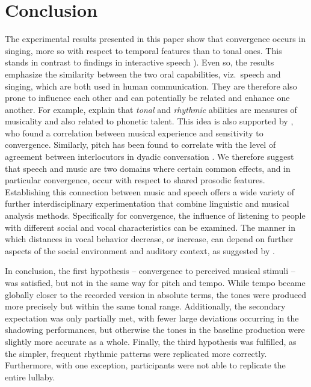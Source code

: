 \section{Conclusion}
\label{sec:conclusion_shadowing}


The experimental results presented in this paper show that convergence occurs in singing, more so with respect to temporal features than to tonal ones.
This stands in contrast to findings in interactive speech \citep[e.g.,][]{Raveh2019InterspeechAlexa}).
Even so, the results emphasize the similarity between the two oral capabilities, viz.\ speech and singing, which are both used in human communication.
They are therefore also prone to influence each other and can potentially be related and enhance one another.
For example, \citet[][p.\ 216]{Nardo2009musicality} explain that \emph{tonal} and \emph{rhythmic} abilities are measures of musicality and also related to phonetic talent.
This idea is also supported by \citet{Tsang2018musical}, who found a correlation between musical experience and sensitivity to convergence.
Similarly, pitch has been found to correlate with the level of agreement between interlocutors in dyadic conversation \citep{Okada2012interpreting}.
We therefore suggest that speech and music are two domains where certain common effects, and in particular convergence, occur with respect to shared prosodic features.
Establishing this connection between music and speech offers a wide variety of further interdisciplinary experimentation that combine linguistic and musical analysis methods.
Specifically for convergence, the influence of listening to people with different social and vocal characteristics can be examined.
The manner in which distances in vocal behavior decrease, or increase, can depend on further aspects of the social environment and auditory context, as suggested by \citet{Noy1999psychoanalysis}.

In conclusion, the first hypothesis -- convergence to perceived musical stimuli -- was satisfied, but not in the same way for pitch and tempo.
While tempo became globally closer to the recorded version in absolute terms, the tones were produced more precisely but within the same tonal range.
Additionally, the secondary expectation was only partially met, with fewer large deviations occurring in the shadowing performances, but otherwise the tones in the baseline production were slightly more accurate as a whole.
Finally, the third hypothesis was fulfilled, as the simpler, frequent rhythmic patterns were replicated more correctly.
Furthermore, with one exception, participants were not able to replicate the entire lullaby.



